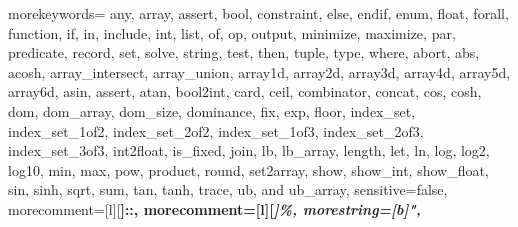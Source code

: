 

{
morekeywords={
any, array, assert, bool, constraint, else, endif, enum, float, forall, 
function,
if, in, include, int, list, of, op, output, minimize, maximize, par, predicate, record, set,
solve, string, test, then, tuple, type, where,
abort, abs, acosh, array_intersect, array_union,
array1d, array2d, array3d, array4d, array5d, array6d, asin, assert, atan, bool2int, card,
ceil, combinator, concat, cos, cosh, dom, dom_array, dom_size, dominance,
fix, exp, floor, index_set, index_set_1of2,
index_set_2of2, index_set_1of3, index_set_2of3, index_set_3of3, int2float, is_fixed,
join, lb, lb_array, length, let, ln, log, log2, log10, min, max, pow, product, round, set2array,
show, show_int, show_float, sin, sinh, sqrt, sum, tan, tanh, trace, ub, and ub_array},
sensitive=false, %
morecomment=[l][\bfseries\color{cyan!90!black}]{::},
morecomment=[l][\em\color{green!50!black}]{\%},
morestring=[b]",
}

